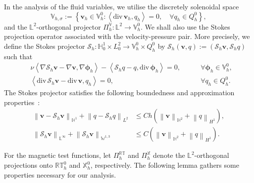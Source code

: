 \documentclass[11pt, reqno]{amsart}
\theoremstyle{definition}
\numberwithin{equation}{section}
\newcommand{\divg}{\mathrm{div}\,}
\newcommand{\bff}{\boldsymbol}
\newcommand{\bb}{\mathbb}
\newcommand{\norm}[2]{\left\|{#1}\right\|_{#2}}
\newcommand{\inpro}[2]{\left\langle#1,#2\right\rangle}
\begin{document}
In the analysis of the fluid variables, we utilise the discretely solenoidal space
\[
\bb V_{h,\sigma}
:=
\left\{\bff v_h\in\bb V_h^0: \inpro{\divg\bff v_h}{q_h}=0,
\quad\forall q_h\in Q_h^0
\right\},
\]
and the $\bb{L}^2$-orthogonal projector $\Pi_h^{\bb V}: \bb{L}^2\to \bb{V}_h^0$.
We shall also use the Stokes projection operator associated with the velocity-pressure pair. More precisely, we define the Stokes projector $\mathcal{S}_h: \bb{H}^1_0\times L^2_0\to \bb{V}_{h}^0\times Q_h^0$ by $\mathcal{S}_h(\bff{v},q):=(\mathcal{S}_h \bff{v}, \mathcal{S}_h q)$ such that 
\begin{subequations}\label{equ:stokes proj}
	\begin{alignat}{2}
		&\nu \inpro{\nabla \mathcal{S}_h \bff{v}-\nabla \bff{v}}{\nabla\bff{\phi}_h}- \inpro{\mathcal{S}_h q - q}{\divg \bff{\phi}_h}= 0,
		\; && \quad\forall \bff{\phi}_h \in \bb{V}_{h}^0,
		\label{equ:stokes proj u}
		\\[1ex]
		&\inpro{\divg \mathcal{S}_h \bff{v}- \divg \bff{v}}{q_h} = 0,
		\; && \quad\forall q_h \in Q_h^0.
		\label{equ:stokes proj p}
	\end{alignat}
\end{subequations}
The Stokes projector satisfies the following boundedness and approximation properties~\cite{GaoQiu19, Vol16}:
\begin{align}\label{equ:Stokes approx}
	\norm{\bff{v}- \mathcal{S}_h \bff{v}}{\bb{H}^1} + \norm{q-\mathcal{S}_h q}{L^2}
	&\leq
	Ch \left(\norm{\bff{v}}{\bb{H}^2}+ \norm{q}{H^1}\right),
	\\
	\label{equ:Stokes bdd}
	\norm{\mathcal{S}_h \bff{v}}{\bb{L}^\infty}+ \norm{\mathcal{S}_h \bff{v}}{\bb{W}^{1,3}} &\leq C \left(\norm{\bff{v}}{\bb{H}^2}+ \norm{q}{H^1}\right).
\end{align}


For the magnetic test functions, let $\Pi_h^{\bb{RT}}$ and $\Pi_h^{\bb{X}}$ denote the $\bb{L}^2$-orthogonal projections onto $\bb{RT}_h^0$ and $\bb{X}_h^0$, respectively. The following lemma gathers some properties necessary for our analysis. 
\end{document}
